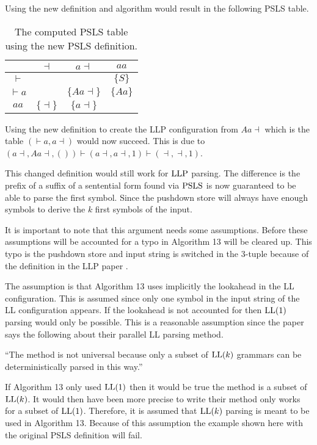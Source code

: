 \noindent Using the new definition and algorithm would result in the following PSLS table.
\begin{table}[H]
    \centering
    \begin{tabular}{c|c|c|c}
        & $\dashv$ & $a\dashv$ & $aa$ \\ \hline
        $\vdash$ & & & $\{S\}$ \\\hline
        $\vdash a$ & & $\{Aa\dashv\}$ & $\{Aa\}$ \\\hline
        $aa$ & $\{\dashv\}$ & $\{a\dashv\}$ & 
    \end{tabular}
    \caption{The computed PSLS table using the new PSLS definition.}
\end{table}
\noindent Using the new definition to create the LLP configuration from $Aa\dashv$ which is the table $(\vdash a,a \dashv)$ would now succeed. This is due to $(a \dashv, Aa\dashv, ()) \vdash (a \dashv, a\dashv, 1) \vdash ( \dashv, \dashv, 1)$.

This changed definition would still work for $\text{LLP}$ parsing. The difference is the prefix of a suffix of a sentential form found via $\text{PSLS}$ is now guaranteed to be able to parse the first symbol. Since the pushdown store will always have enough symbols to derive the $k$ first symbols of the input.

It is important to note that this argument needs some assumptions. Before these assumptions will be accounted for a typo in Algorithm 13 \cite[15]{Vagner2007} will be cleared up. This typo is the pushdown store and input string is switched in the 3-tuple because of the definition in the LLP paper \cite[5]{Vagner2007}.

The assumption is that Algorithm 13 uses implicitly the lookahead in the LL configuration. This is assumed since only one symbol in the input string of the LL configuration appears. If the lookahead is not accounted for then $\text{LL}(1)$ parsing would only be possible. This is a reasonable assumption since the paper says the following about their parallel LL parsing method.
\begin{center}
    ``The method is not universal because only a subset of $\text{LL}(k)$ grammars can be deterministically parsed in this way.'' \cite[2]{Vagner2007}
\end{center}
If Algorithm 13 only used $\text{LL}(1)$ then it would be true the method is a subset of $\text{LL}(k)$. It would then have been more precise to write their method only works for a subset of $\text{LL}(1)$. Therefore, it is assumed that $\text{LL}(k)$ parsing is meant to be used in Algorithm 13. Because of this assumption the example shown here with the original PSLS definition will fail.

